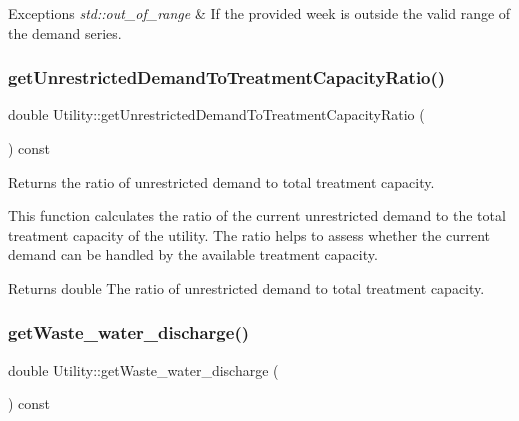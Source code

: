 \begin{DoxyExceptions}{Exceptions}
{\em std\+::out\+\_\+of\+\_\+range} & If the provided week is outside the valid range of the demand series. \\
\hline
\end{DoxyExceptions}
\mbox{\label{classUtility_a73afadbbcd2d1a21452937b514d10c34}} 
\subsubsection{\texorpdfstring{get\+Unrestricted\+Demand\+To\+Treatment\+Capacity\+Ratio()}{getUnrestrictedDemandToTreatmentCapacityRatio()}}
{\footnotesize\ttfamily double Utility\+::get\+Unrestricted\+Demand\+To\+Treatment\+Capacity\+Ratio (\begin{DoxyParamCaption}{ }\end{DoxyParamCaption}) const}



Returns the ratio of unrestricted demand to total treatment capacity. 

This function calculates the ratio of the current unrestricted demand to the total treatment capacity of the utility. The ratio helps to assess whether the current demand can be handled by the available treatment capacity.

\begin{DoxyReturn}{Returns}
double The ratio of unrestricted demand to total treatment capacity. 
\end{DoxyReturn}
\mbox{\label{classUtility_a68dc298c3078ff450cdc7b6a69422da1}} 
\subsubsection{\texorpdfstring{get\+Waste\+\_\+water\+\_\+discharge()}{getWaste\_water\_discharge()}}
{\footnotesize\ttfamily double Utility\+::get\+Waste\+\_\+water\+\_\+discharge (\begin{DoxyParamCaption}{ }\end{DoxyParamCaption}) const}




